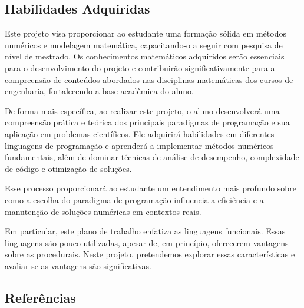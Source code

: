 \subsection{Habilidades Adquiridas}

Este projeto visa proporcionar ao estudante uma formação sólida em métodos
numéricos e modelagem matemática, capacitando-o a seguir com pesquisa de nível
de mestrado. Os conhecimentos matemáticos adquiridos serão essenciais para o
desenvolvimento do projeto e contribuirão significativamente para a compreensão
de conteúdos abordados nas disciplinas matemáticas dos cursos de engenharia,
fortalecendo a base acadêmica do aluno.

De forma mais específica, ao realizar este projeto, o aluno desenvolverá uma
compreensão prática e teórica dos principais paradigmas de programação e sua
aplicação em problemas científicos. Ele adquirirá habilidades em diferentes
linguagens de programação e aprenderá a implementar métodos numéricos
fundamentais, além de dominar técnicas de análise de desempenho, complexidade
de código e otimização de soluções.

Esse processo proporcionará ao estudante um entendimento mais profundo sobre
como a escolha do paradigma de programação influencia a eficiência e a
manutenção de soluções numéricas em contextos reais.

Em particular, este plano de trabalho enfatiza as linguagens funcionais. Essas
linguagens são pouco utilizadas, apesar de, em princípio, oferecerem vantagens
sobre as procedurais. Neste projeto, pretendemos explorar essas características
e avaliar se as vantagens são significativas.

\subsection{Referências}

